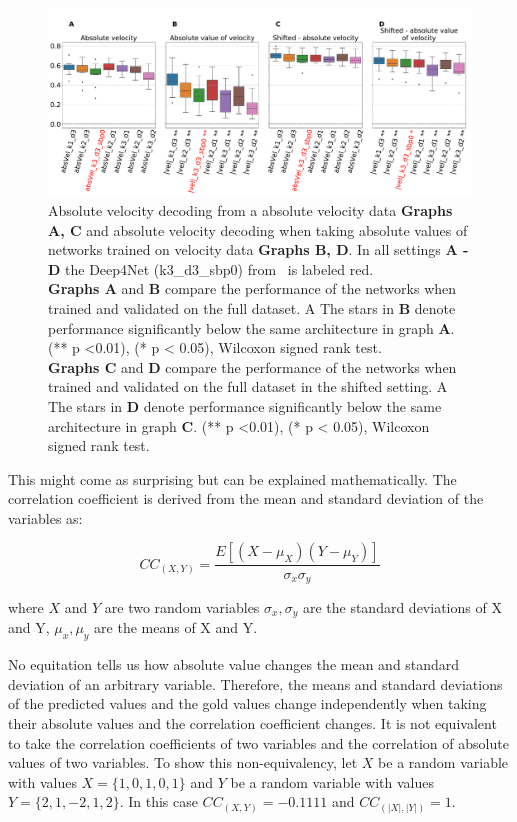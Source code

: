 \begin{figure}[!htpb]
\centering
   \includegraphics[width=1\linewidth]{img/ch4/absVel_vs_abs_vel_performance_comparison}
   \caption[Absolute velocity vs. absolute value of velocity comparison]{Absolute velocity decoding from a absolute velocity data \textbf{Graphs A, C} and absolute velocity decoding when taking absolute values of networks trained on velocity data \textbf{Graphs B, D}. In all settings \textbf{
   A - D} the Deep4Net (k3\_d3\_sbp0) from~\cite{Hammer-2021} is labeled red.\\ \textbf{Graphs A} and \textbf{B} compare the performance of the networks when trained and validated on the full dataset. A The stars in \textbf{B} denote performance significantly below the same architecture in graph \textbf{A}. (** p <0.01), (* p < 0.05), Wilcoxon signed rank test.
   \\\textbf{Graphs C} and \textbf{D} compare the performance of the networks when trained and validated on the full dataset in the shifted setting. A The stars in \textbf{D} denote performance significantly below the same architecture in graph \textbf{C}. (** p <0.01), (* p < 0.05), Wilcoxon signed rank test.}
   \label{fig:absVel-vs-abs-vel-performance}
\end{figure}

This might come as surprising but can be explained mathematically. The correlation coefficient is derived from the mean and standard deviation of the variables as:

\begin{equation}
    CC_{(X, Y)}= \frac{E[(X - \mu_X)(Y - \mu_Y)] }{\sigma_x \sigma_y}
    \label{eq:correlation}
\end{equation}

where $X$ and $Y$ are two random variables $\sigma_x, \sigma_y$ are the standard deviations of X and Y, $ \mu_x, \mu_y$ are the means of X and Y.

No equitation tells us how absolute value changes the mean and standard deviation of an arbitrary variable. Therefore, the means and standard deviations of the predicted values and the gold values change independently when taking their absolute values and the correlation coefficient changes.
It is not equivalent to take the correlation coefficients of two variables and the correlation of absolute values of two variables. 
To show this non-equivalency, let $X$ be a random variable with values $X = \{1, 0, 1, 0, 1\} $ and $Y$ be a random variable with values $Y = \{2, 1, -2, 1, 2\}$. In this case $CC_{(X,Y)} = -0.1111$ and $CC_{(|X|,|Y|)} = 1$.

